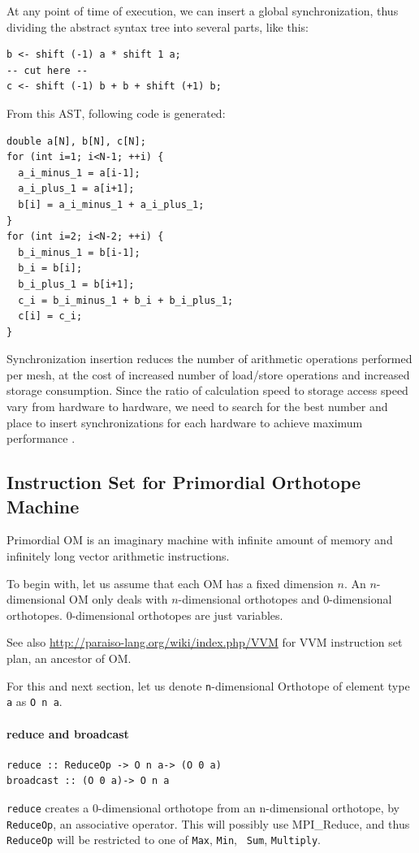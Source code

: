 \documentclass[twocolumn]{article}
\begin{document}
At any point of time of execution, we can insert a global
synchronization, thus dividing the abstract syntax tree into several
parts, like this:

\begin{verbatim}
b <- shift (-1) a * shift 1 a;
-- cut here --
c <- shift (-1) b + b + shift (+1) b;
\end{verbatim}

From this AST, following code is generated:

\begin{verbatim}
double a[N], b[N], c[N];
for (int i=1; i<N-1; ++i) {
  a_i_minus_1 = a[i-1];
  a_i_plus_1 = a[i+1];
  b[i] = a_i_minus_1 + a_i_plus_1;
}
for (int i=2; i<N-2; ++i) {
  b_i_minus_1 = b[i-1];
  b_i = b[i];
  b_i_plus_1 = b[i+1];
  c_i = b_i_minus_1 + b_i + b_i_plus_1;
  c[i] = c_i;
}
\end{verbatim}

Synchronization insertion reduces the number of arithmetic operations
performed per mesh, at the cost of increased number of load/store
operations and increased storage consumption. Since the ratio of
calculation speed to storage access speed vary from hardware to
hardware, we need to search for the best number and place to insert
synchronizations for each hardware to achieve maximum performance .




\subsection{Instruction Set for Primordial Orthotope Machine}
Primordial OM is an imaginary machine with infinite amount of memory and
infinitely long vector arithmetic instructions. 

To begin with, let us assume that each OM has a fixed dimension $n$. An
$n$-dimensional OM only deals with $n$-dimensional orthotopes and
0-dimensional orthotopes. 0-dimensional orthotopes are just variables.

See also \url{http://paraiso-lang.org/wiki/index.php/VVM} for VVM instruction
set plan, an ancestor of OM.

For this and next section, let us denote {\tt n}-dimensional Orthotope of
element type {\tt a} as {\tt O n a}.

\paragraph{reduce and broadcast}
\begin{verbatim}
reduce :: ReduceOp -> O n a-> (O 0 a)
broadcast :: (O 0 a)-> O n a
\end{verbatim}
{\tt reduce} creates a 0-dimensional orthotope from an n-dimensional orthotope, by {\tt
  ReduceOp}, an associative operator. This will possibly use MPI\_Reduce, and
thus {\tt ReduceOp} will be restricted to one of {\tt Max}, {\tt Min}, {\tt
  Sum}, {\tt Multiply}.
\end{document}

